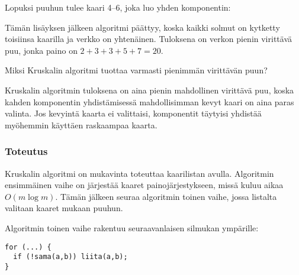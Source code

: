 \begin{samepage}
Lopuksi puuhun tulee kaari 4--6,
joka luo yhden komponentin:

\begin{center}
\end{center}
\end{samepage}

Tämän lisäyksen jälkeen algoritmi päättyy,
koska kaikki solmut on kytketty toisiinsa kaarilla
ja verkko on yhtenäinen.
Tuloksena on verkon pienin virittävä puu,
jonka paino on $2+3+3+5+7=20$.

Miksi Kruskalin algoritmi tuottaa varmasti
pienimmän virittävän puun?

Kruskalin algoritmin
tuloksena on aina pienin mahdollinen
virittävä puu,
koska kahden komponentin
yhdistämisessä mahdollisimman kevyt kaari
on aina paras valinta.
Jos kevyintä kaarta ei valittaisi,
komponentit täytyisi yhdistää
myöhemmin käyttäen raskaampaa kaarta.

\subsubsection{Toteutus}

Kruskalin algoritmi on mukavinta toteuttaa
kaarilistan avulla. Algoritmin ensimmäinen vaihe
on järjestää kaaret painojärjestykseen,
missä kuluu aikaa $O(m \log m)$.
Tämän jälkeen seuraa algoritmin toinen vaihe,
jossa listalta valitaan kaaret mukaan puuhun.

Algoritmin toinen vaihe rakentuu seuraavanlaisen silmukan ympärille:

\begin{lstlisting}
for (...) {
  if (!sama(a,b)) liita(a,b);
}
\end{lstlisting}

